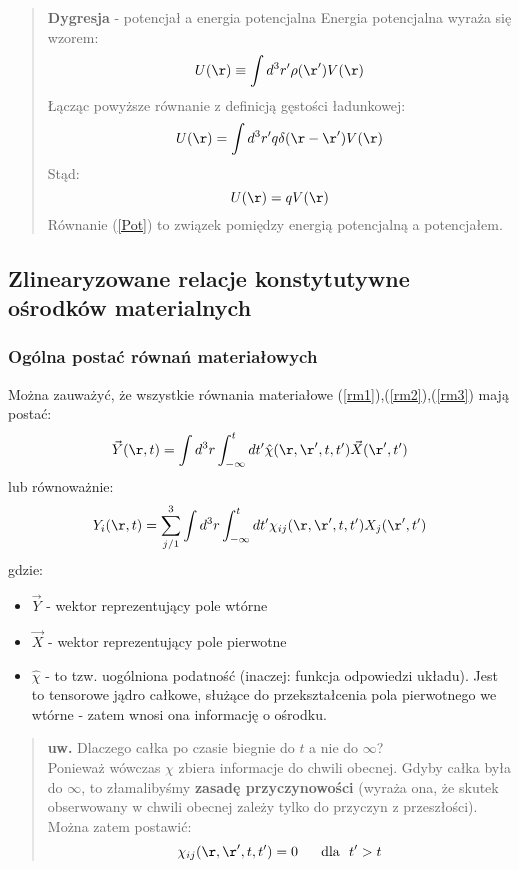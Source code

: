 \begin{enumerate}
\begin{verse}{\textbf{Dygresja} - potencjał a energia potencjalna}
Energia potencjalna wyraża się wzorem:
\begin{equation} U(\r) \equiv \int d^3r'\rho(\r')V(\r) \end{equation}
Łącząc powyższe równanie z definicją gęstości ładunkowej:
\begin{equation} U(\r) = \int d^3r'q\delta(\r-\r')V(\r)\end{equation}
Stąd:
\begin{equation} U(\r) = qV(\r) \label{Pot}\end{equation}
Równanie (\ref{Pot}) to związek pomiędzy energią potencjalną a potencjałem.
\end{verse}
\end{enumerate}
\subsection{Zlinearyzowane relacje konstytutywne ośrodków materialnych}
\subsubsection{Ogólna postać równań materiałowych}
Można zauważyć, że wszystkie równania materiałowe (\ref{rm1}),(\ref{rm2}),(\ref{rm3}) mają postać:
\begin{equation} \vec{Y}(\r,t)=\int d^3r \int_{-\infty}^t dt' \hat{\chi}(\r,\r',t,t') \vec{X}(\r',t') \end{equation}
lub równoważnie:
\begin{equation} {Y}_i(\r,t)=\sum_{j/1}^3 \int d^3r \int_{-\infty}^t dt' {\chi}_{ij}(\r,\r',t,t') X_j(\r',t') \end{equation}
gdzie:\\
\begin{itemize} \item $\vec{Y}$ - wektor reprezentujący pole wtórne
\item $\vec{X}$ - wektor reprezentujący pole pierwotne
\item $\hat{\chi} $ - to tzw. uogólniona podatność (inaczej: funkcja odpowiedzi układu). Jest to tensorowe jądro całkowe, służące do przekształcenia pola pierwotnego we wtórne - zatem wnosi ona informację o ośrodku.
\end{itemize}
\begin{verse}\textbf{uw.}
Dlaczego całka po czasie biegnie do $t$ a nie do $\infty$? \\
Ponieważ wówczas $\chi$ zbiera informacje do chwili obecnej. Gdyby całka była do $\infty$, to złamalibyśmy \textbf{zasadę przyczynowości} (wyraża ona, że skutek obserwowany w chwili obecnej zależy tylko do przyczyn z przeszłości). \\
Można zatem postawić:
\begin{equation}\chi_{ij}(\r,\r',t,t')=0 \text{ ~~~~dla~ } t'>t\end{equation}
\end{verse}

